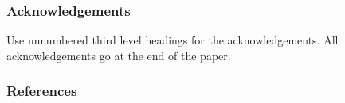 \documentclass[twoside]{article}
\begin{document}
\subsubsection*{Acknowledgements}

Use unnumbered third level headings for the acknowledgements.  All
acknowledgements go at the end of the paper.

\subsubsection*{References}


\end{document}
